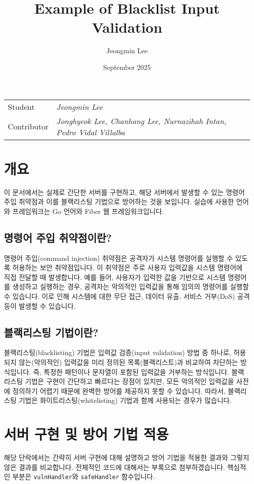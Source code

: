 \documentclass{article}
\title{Example of Blacklist Input Validation}
\author{Jeongmin Lee}
\date{September 2025}
\begin{document}
\maketitle

\noindent\begin{tabular}{@{}ll}
  Student & \textit{Jeongmin Lee}\\
  Contributor & \textit{Jonghyeok Lee, Chanhang Lee, Nurnazihah Intan, Pedro Vidal Villalba}\\
\end{tabular}

\section{개요}
이 문서에서는 실제로 간단한 서버를 구현하고, 해당 서버에서 발생할 수 있는 명령어 주입 취약점과 이를 블랙리스팅 기법으로 방어하는 것을 보입니다.
실습에 사용한 언어와 프레임워크는 Go 언어와 Fiber 웹 프레임워크입니다.
\subsection{명령어 주입 취약점이란?}
명령어 주입(command injection) 취약점은 공격자가 시스템 명령어를 실행할 수 있도록 허용하는 보안 취약점입니다.
이 취약점은 주로 사용자 입력값을 시스템 명령어에 직접 전달할 때 발생합니다.
예를 들어, 사용자가 입력한 값을 기반으로 시스템 명령어를 생성하고 실행하는 경우, 공격자는 악의적인 입력값을 통해 임의의 명령어를 실행할 수 있습니다.
이로 인해 시스템에 대한 무단 접근, 데이터 유출, 서비스 거부(DoS) 공격 등이 발생할 수 있습니다.
\subsection{블랙리스팅 기법이란?}
블랙리스팅(blacklisting) 기법은 입력값 검증(input validation) 방법 중 하나로, 허용되지 않는(악의적인) 입력값을 미리 정의된 목록(블랙리스트)과 비교하여 차단하는 방식입니다.
즉, 특정한 패턴이나 문자열이 포함된 입력값을 거부하는 방식입니다.
블랙리스팅 기법은 구현이 간단하고 빠르다는 장점이 있지만, 모든 악의적인 입력값을 사전에 정의하기 어렵기 때문에 완벽한 방어를 제공하지 못할 수 있습니다.
따라서, 블랙리스팅 기법은 화이트리스팅(whitelisting) 기법과 함께 사용되는 경우가 많습니다.

\section{서버 구현 및 방어 기법 적용}
해당 단락에서는 간략히 서버 구현에 대해 설명하고 방어 기법을 적용한 결과와 그렇지 않은 결과를 비교합니다. 
전체적인 코드에 대해서는 부록으로 첨부하겠습니다.
핵심적인 부분은 \texttt{vulnHandler}와 \texttt{safeHandler} 함수입니다.
\end{document}
